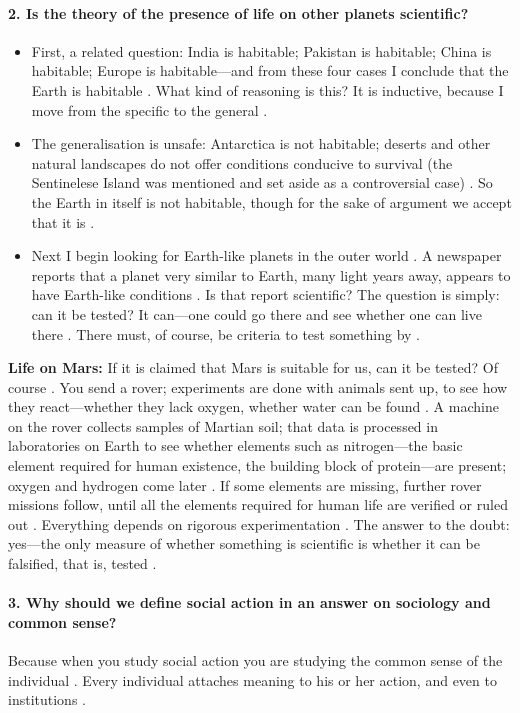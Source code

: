 \paragraph{2. Is the theory of the presence of life on other planets scientific?}
\begin{itemize}
    \item First, a related question: India is habitable; Pakistan is habitable; China is habitable; Europe is habitable---and from these four cases I conclude that the Earth is habitable . What kind of reasoning is this? It is inductive, because I move from the specific to the general .
    \item The generalisation is unsafe: Antarctica is not habitable; deserts and other natural landscapes do not offer conditions conducive to survival (the Sentinelese Island was mentioned and set aside as a controversial case) . So the Earth in itself is not habitable, though for the sake of argument we accept that it is .
    \item Next I begin looking for Earth-like planets in the outer world . A newspaper reports that a planet very similar to Earth, many light years away, appears to have Earth-like conditions . Is that report scientific? The question is simply: can it be tested? It can---one could go there and see whether one can live there . There must, of course, be criteria to test something by .
\end{itemize}

\begin{ExampleBox}
\textbf{Life on Mars:} If it is claimed that Mars is suitable for us, can it be tested? Of course . You send a rover; experiments are done with animals sent up, to see how they react---whether they lack oxygen, whether water can be found . A machine on the rover collects samples of Martian soil; that data is processed in laboratories on Earth to see whether elements such as nitrogen---the basic element required for human existence, the building block of protein---are present; oxygen and hydrogen come later . If some elements are missing, further rover missions follow, until all the elements required for human life are verified or ruled out . Everything depends on rigorous experimentation . The answer to the doubt: yes---the only measure of whether something is scientific is whether it can be falsified, that is, tested .
\end{ExampleBox}

\paragraph{3. Why should we define social action in an answer on sociology and common sense?}
Because when you study social action you are studying the common sense of the individual . Every individual attaches meaning to his or her action, and even to institutions .

